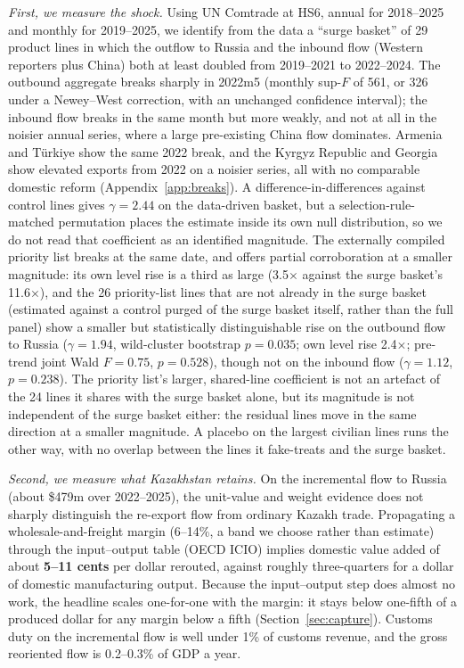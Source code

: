 \documentclass[12pt]{article}
\begin{document}
\emph{First, we measure the shock.} Using UN Comtrade at HS6, annual for 2018--2025 and
monthly for 2019--2025, we identify from the data a ``surge basket'' of 29 product lines in
which the outflow to Russia and the inbound flow (Western reporters plus China) both at least
doubled from 2019--2021 to 2022--2024. The outbound aggregate breaks sharply in 2022m5 (monthly
sup-$F$ of 561, or 326 under a Newey--West correction, with an unchanged confidence interval);
the inbound flow breaks in the same month but more weakly, and not at all in the noisier annual
series, where a large pre-existing China flow dominates. Armenia and T\"urkiye show the same
2022 break, and the Kyrgyz Republic and Georgia show elevated exports from 2022 on a noisier
series, all with no comparable domestic reform (Appendix~\ref{app:breaks}). A difference-in-differences against
control lines gives $\gamma = 2.44$ on the data-driven basket, but a selection-rule-matched
permutation places the estimate inside its own null distribution, so we do not read that
coefficient as an identified magnitude. The externally compiled priority list breaks at the
same date, and offers partial corroboration at a smaller magnitude: its own level rise is a
third as large (3.5$\times$ against the surge basket's 11.6$\times$), and the 26 priority-list
lines that are not already in the surge basket (estimated against a control purged of the
surge basket itself, rather than the full panel) show a smaller but statistically
distinguishable rise on the outbound flow to Russia ($\gamma = 1.94$, wild-cluster bootstrap
$p = 0.035$; own level rise 2.4$\times$; pre-trend joint Wald $F = 0.75$, $p = 0.528$), though
not on the inbound flow ($\gamma = 1.12$,
$p = 0.238$). The priority list's larger, shared-line coefficient is not an artefact of the 24
lines it shares with the surge basket alone, but its magnitude is not independent of the
surge basket either: the residual lines move in the same direction at a smaller magnitude.
A placebo on the largest civilian lines runs the other way, with no
overlap between the lines it fake-treats and the surge basket.

\emph{Second, we measure what Kazakhstan retains.} On the incremental flow to Russia (about
\$479m over 2022--2025), the unit-value and weight evidence does not sharply distinguish the
re-export flow from ordinary Kazakh trade. Propagating a wholesale-and-freight margin
(6--14\%, a band we choose rather than estimate) through the input--output table (OECD ICIO)
implies domestic value added of about \textbf{5--11 cents} per dollar rerouted, against roughly
three-quarters for a dollar of domestic manufacturing output. Because the input--output step
does almost no work, the headline scales one-for-one with the margin: it stays below one-fifth
of a produced dollar for any margin below a fifth (Section~\ref{sec:capture}). Customs duty
on the incremental flow is well under 1\% of customs revenue, and the gross reoriented flow is
0.2--0.3\% of GDP a year.
\end{document}
